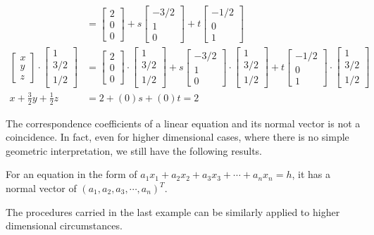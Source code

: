 \begin{exmp}
\begin{align*}
&=
\begin{bmatrix}
2 \\
0 \\
0
\end{bmatrix}
+ s
\begin{bmatrix}
-3/2 \\
1 \\
0
\end{bmatrix}
+ t
\begin{bmatrix}
-1/2 \\
0 \\
1
\end{bmatrix} \\
\begin{bmatrix}
x \\
y \\
z
\end{bmatrix}
\cdot
\begin{bmatrix}
1 \\
3/2 \\
1/2
\end{bmatrix}
&=
\begin{bmatrix}
2 \\
0 \\
0
\end{bmatrix}
\cdot
\begin{bmatrix}
1 \\
3/2 \\
1/2
\end{bmatrix}
+ s
\begin{bmatrix}
-3/2 \\
1 \\
0
\end{bmatrix}
\cdot
\begin{bmatrix}
1 \\
3/2 \\
1/2
\end{bmatrix}
+ t
\begin{bmatrix}
-1/2 \\
0 \\
1
\end{bmatrix}
\cdot
\begin{bmatrix}
1 \\
3/2 \\
1/2
\end{bmatrix} \\
x + \frac{3}{2}y + \frac{1}{2}z &= 2 + (0)s + (0)t = 2
\end{align*}
\end{exmp}
The correspondence coefficients of a linear equation and its normal vector is not a coincidence. In fact, even for higher dimensional cases, where there is no simple geometric interpretation, we still have the following results.
\begin{thm}
\label{normalvec}
For an equation in the form of $a_1x_1 + a_2x_2 + a_3x_3 + \cdots + a_nx_n = h$, it has a normal vector of $(a_1, a_2, a_3, \cdots, a_n)^T$.
\end{thm}
The procedures carried in the last example can be similarly applied to higher dimensional circumstances.

